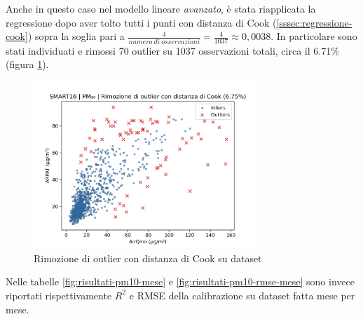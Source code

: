 Anche in questo caso nel modello lineare \textit{avanzato}, è stata riapplicata la regressione dopo aver tolto tutti i punti con distanza di Cook (\ref{sssec:regressione-cook}) sopra la soglia pari a $\frac{4}{numero\ di\ osservazioni} = \frac{4}{1037} \approx 0,0038$. In particolare sono stati individuati e rimossi 70 outlier su 1037 osservazioni totali, circa il 6.71\% (figura \ref{fig:cook-pm10}).

\begin{figure}[H]
\centering
\includegraphics[width=0.75\textwidth,height=\textheight,keepaspectratio]{img/cook_pm10.png}
\caption{Rimozione di outlier con distanza di Cook su dataset }%
\label{fig:cook-pm10}%
\end{figure}

Nelle tabelle \ref{fig:risultati-pm10-mese} e \ref{fig:risultati-pm10-rmse-mese} sono invece riportati rispettivamente $R^2$ e RMSE della calibrazione su dataset  fatta mese per mese.


